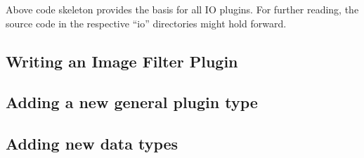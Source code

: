 \documentclass[english, 10pt, a4paper,headsepline,openany]{scrbook}
\begin{document}
\noindent 
Above code skeleton provides the basis for all IO plugins. 
For further reading, the source code in the respective ``io'' directories might hold forward. 

\subsection{Writing an Image Filter Plugin}
\label{ch:filterplugin}

\subsection{Adding a new general plugin type}
\label{ch:addpluginstype}

\subsection{Adding new data types}
\label{sec:adddatatypeio}



\cleardoublepage{}

\end{document}
